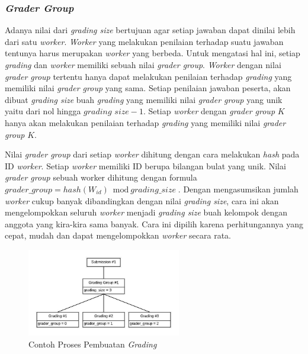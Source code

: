 \subsubsection{\textit{Grader Group}}

\par Adanya nilai dari \textit{grading size} bertujuan agar setiap jawaban dapat dinilai lebih dari satu \textit{worker}. \textit{Worker} yang melakukan penilaian terhadap suatu jawaban tentunya harus merupakan \textit{worker} yang berbeda. Untuk mengatasi hal ini, setiap \textit{grading} dan \textit{worker} memiliki sebuah nilai \textit{grader group}. \textit{Worker} dengan nilai \textit{grader group} tertentu hanya dapat melakukan penilaian terhadap \textit{grading} yang memiliki nilai \textit{grader group} yang sama. Setiap penilaian jawaban peserta, akan dibuat \textit{grading size} buah \textit{grading} yang memiliki nilai \textit{grader group} yang unik yaitu dari nol hingga $\textit{grading size} - 1$. Setiap \textit{worker} dengan \textit{grader group} $K$ hanya akan melakukan penilaian terhadap \textit{grading} yang memiliki nilai \textit{grader group} $K$.

\par Nilai \textit{grader group} dari setiap \textit{worker} dihitung dengan cara melakukan \textit{hash} pada ID \textit{worker}. Setiap \textit{worker} memiliki ID berupa bilangan bulat yang unik. Nilai \textit{grader group} sebuah worker dihitung dengan formula $\textit{grader\_group} = hash(W_{id}) \bmod \textit{grading\_size}$. Dengan mengasumsikan jumlah \textit{worker} cukup banyak dibandingkan dengan nilai \textit{grading size}, cara ini akan mengelompokkan seluruh \textit{worker} menjadi \textit{grading size} buah kelompok dengan anggota yang kira-kira sama banyak. Cara ini dipilih karena perhitungannya yang cepat, mudah dan dapat mengelompokkan \textit{worker} secara rata.

\begin{figure}[ht!]
    \centering
    \includegraphics[width=0.6\textwidth]{images/grading-example-1}
    \caption{Contoh Proses Pembuatan \textit{Grading}}
    \label{fig:grading-example-1}
\end{figure}


